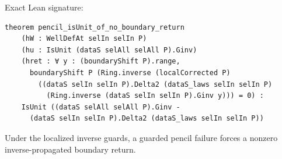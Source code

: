 \begin{theorem}[bp-018]
\begin{itemize}
\end{itemize}
\par Exact Lean signature:
\begin{verbatim}
theorem pencil_isUnit_of_no_boundary_return
    (hW : WellDefAt selIn selIn P)
    (hu : IsUnit (dataS selAll selAll P).Ginv)
    (hret : ∀ y : (boundaryShift P).range,
      boundaryShift P (Ring.inverse (localCorrected P)
        ((dataS selIn selIn P).Delta2 (dataS_laws selIn selIn P)
          (Ring.inverse (dataS selIn selIn P).Ginv y))) = 0) :
    IsUnit ((dataS selAll selAll P).Ginv -
      (dataS selIn selIn P).Delta2 (dataS_laws selIn selIn P))
\end{verbatim}
\end{theorem}

\begin{theorem}[bp-019]
\label{bp-019}
\leanok
Under the localized inverse guards, a guarded pencil failure forces a nonzero inverse-propagated boundary return.


\end{theorem}
